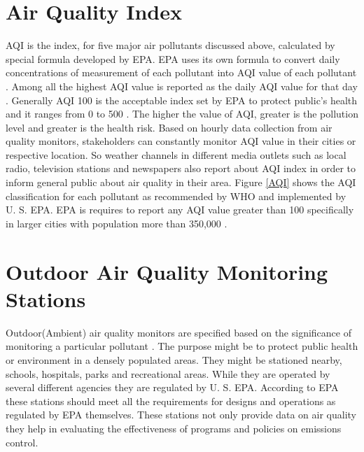 \documentclass[sigconf]{acmart}
\begin{document}
\section{Air Quality Index}
   AQI is the index, for five major air pollutants discussed above, calculated by special formula developed by EPA. EPA uses its own formula to convert daily concentrations of measurement of each pollutant into AQI value of each pollutant \cite{airnow-gov}. Among all the highest AQI value is reported as the daily AQI value for that day \cite{airnow-gov}.  Generally AQI 100 is the acceptable index set by EPA to protect public's health and it ranges from 0 to 500 \cite{airnow-gov}. The higher the value of AQI, greater is the pollution level and greater is the health risk. Based on hourly data collection from air quality monitors, stakeholders can constantly monitor AQI value in their cities or respective location. So weather channels in different media outlets such as local radio, television stations and newspapers also report about AQI index in order to inform general public about air quality in their area. Figure \ref{AQI} shows the AQI classification for each pollutant as recommended by WHO and implemented by U. S. EPA. EPA is requires to report any AQI value greater than 100 specifically in larger cities with population more than 350,000 \cite{airnow-gov}.


\section{Outdoor Air Quality Monitoring Stations}
   Outdoor(Ambient) air quality monitors are specified based on the significance of monitoring a particular pollutant \cite{air-quality}. The purpose might be to protect public health or environment in a densely populated areas. They might be stationed nearby, schools, hospitals, parks and recreational areas. While they are operated by several different agencies they are regulated by U. S. EPA. According to EPA these stations should meet all the requirements for designs and operations as regulated by EPA themselves. These stations not only provide data on air quality they help in evaluating the effectiveness of programs and policies on emissions control.
\end{document}
